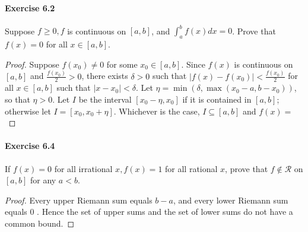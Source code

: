 \documentclass{article}
\theoremstyle{definition}
\begin{document}
\paragraph{Exercise 6.2} Suppose $f \geq 0, f$ is continuous on $[a, b]$, and $\int_{a}^{b} f(x) d x=0$. Prove that $f(x)=0$ for all $x \in[a, b]$.
\begin{proof}
    Suppose $f\left(x_0\right) \neq 0$ for some $x_0 \in[a, b]$. Since $f(x)$ is continuous on $[a, b]$ and $\frac{f\left(x_0\right)}{2}>0$, there exists $\delta>0$ such that $\left|f(x)-f\left(x_0\right)\right|<\frac{f\left(x_0\right)}{2}$ for all $x \in[a, b]$ such that $\left|x-x_0\right|<\delta$. Let $\eta=\min \left(\delta, \max \left(x_0-a, b-x_0\right)\right)$, so that $\eta>0$. Let $I$ be the interval $\left[x_0-\eta, x_0\right]$ if it is contained in $[a, b]$; otherwise let $I=\left[x_0, x_0+\eta\right]$. Whichever is the case, $I \subseteq[a, b]$ and $f(x)=$
\end{proof}


\paragraph{Exercise 6.4} If $f(x)=0$ for all irrational $x, f(x)=1$ for all rational $x$, prove that $f \notin \mathcal{R}$ on $[a, b]$ for any $a<b$.
\begin{proof}
    Every upper Riemann sum equals $b-a$, and every lower Riemann sum equals 0 . Hence the set of upper sums and the set of lower sums do not have a common bound.
\end{proof}
\end{document}
